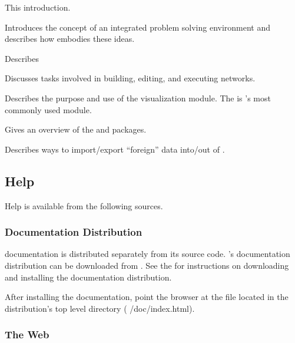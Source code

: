 \begin{description}
   This introduction.
  
   Introduces the concept of
  an integrated problem solving environment and describes how \SR{}
  embodies these ideas.
  
   Describes

  Discusses tasks involved in building, editing, and executing
  networks.

  Describes the purpose and use of the \viewer visualization module.
  The \viewer{} is \sr{}'s most commonly used module.

   Gives an overview
  of the \sr{} and \biopse{} packages.
  
   Describes
  ways to import/export ``foreign'' data into/out of \SR{}.
\end{description}

\subsection{Help}
\label{sec:help}

Help is available from the following sources.

\subsubsection{Documentation Distribution}

\sr{} documentation is distributed separately from its source code.
\sr{}'s documentation distribution can be downloaded from
.  See the \sr{}
for instructions on downloading and installing the documentation
distribution.

After installing the documentation, point the browser at the
 file located in the distribution's top level
 directory (\ie{} /doc/index.html).

\subsubsection{The Web}

